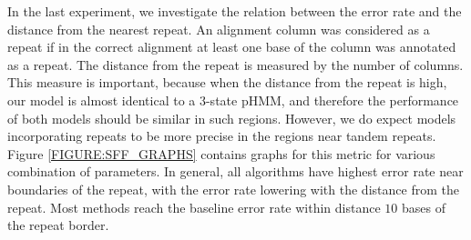 In the last experiment, we investigate the relation between the error rate and
the distance from the nearest repeat.  An alignment column was considered as a
repeat if in the correct alignment at least one base of the column was
annotated as a repeat.  The distance from the repeat is measured by the number
of columns. This measure is important, because when the distance from the
repeat is high, our model is almost identical to a 3-state pHMM, and therefore
the performance of both models should be similar in such regions. However, we
do expect models incorporating repeats to be more precise in the regions near
tandem repeats.  Figure \ref{FIGURE:SFF_GRAPHS} contains graphs for this metric
for various combination of parameters. In general, all algorithms have highest
error rate near boundaries of the repeat, with the error rate lowering with the
distance from the repeat. Most methods reach the baseline error rate within
distance $10$ bases of the repeat border.

